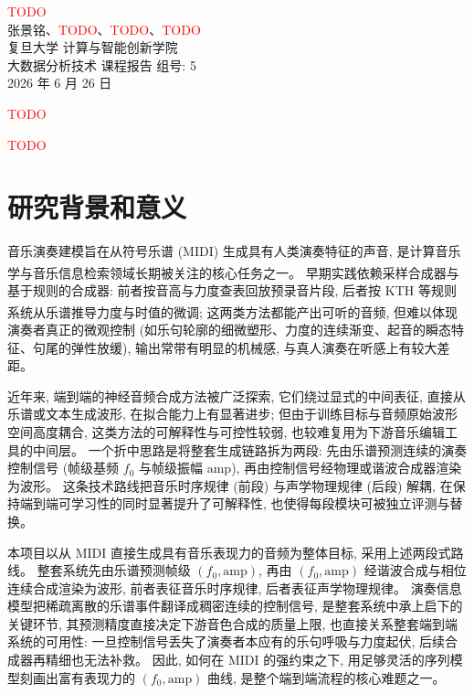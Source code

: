 \documentclass[a4paper, UTF8, zihao=-4, fontset=fandol]{ctexart}
\newcommand{\upcite}[1]{\textsuperscript{\cite{#1}}}
\begin{document}
\begin{center}
{\heiti{} \textcolor{red}{TODO}}
\\[8mm]
{
张景铭、\textcolor{red}{TODO}、\textcolor{red}{TODO}、\textcolor{red}{TODO}\\[2mm]
复旦大学 计算与智能创新学院 \\[2mm]
大数据分析技术 \quad 课程报告 \quad 组号: 5 \\[2mm]
2026 年 6 月 26 日
}
\end{center}

\vspace{5mm}

\quad
\textcolor{red}{TODO}

\vspace{3mm}
\quad \textcolor{red}{TODO}

\vspace{8mm}

\section{研究背景和意义}

音乐演奏建模旨在从符号乐谱 (MIDI) 生成具有人类演奏特征的声音, 是计算音乐学与音乐信息检索领域长期被关注的核心任务之一\upcite{cancino}。 早期实践依赖采样合成器与基于规则的合成器: 前者按音高与力度查表回放预录音片段, 后者按 KTH 等规则系统\upcite{kth}从乐谱推导力度与时值的微调; 这两类方法都能产出可听的音频, 但难以体现演奏者真正的微观控制 (如乐句轮廓的细微塑形、力度的连续渐变、起音的瞬态特征、句尾的弹性放缓), 输出常带有明显的机械感, 与真人演奏在听感上有较大差距。

近年来, 端到端的神经音频合成方法被广泛探索, 它们绕过显式的中间表征, 直接从乐谱或文本生成波形, 在拟合能力上有显著进步; 但由于训练目标与音频原始波形空间高度耦合, 这类方法的可解释性与可控性较弱, 也较难复用为下游音乐编辑工具的中间层。 一个折中思路是将整套生成链路拆为两段: 先由乐谱预测连续的演奏控制信号 (帧级基频 $f_0$ 与帧级振幅 $\mathrm{amp}$), 再由控制信号经物理或谐波合成器渲染为波形。 这条技术路线把音乐时序规律 (前段) 与声学物理规律 (后段) 解耦, 在保持端到端可学习性的同时显著提升了可解释性, 也使得每段模块可被独立评测与替换。

本项目以从 MIDI 直接生成具有音乐表现力的音频为整体目标, 采用上述两段式路线。 整套系统先由乐谱预测帧级 $(f_0, \mathrm{amp})$, 再由 $(f_0, \mathrm{amp})$ 经谐波合成与相位连续合成渲染为波形, 前者表征音乐时序规律, 后者表征声学物理规律。 演奏信息模型把稀疏离散的乐谱事件翻译成稠密连续的控制信号, 是整套系统中承上启下的关键环节, 其预测精度直接决定下游音色合成的质量上限, 也直接关系整套端到端系统的可用性: 一旦控制信号丢失了演奏者本应有的乐句呼吸与力度起伏, 后续合成器再精细也无法补救。 因此, 如何在 MIDI 的强约束之下, 用足够灵活的序列模型刻画出富有表现力的 $(f_0, \mathrm{amp})$ 曲线, 是整个端到端流程的核心难题之一。
\end{document}
